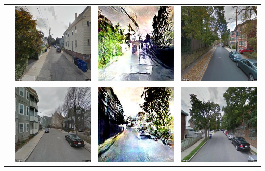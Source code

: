 \begin{table}
\begin{tabular}{l*3{C}@{}}
        & \includegraphics[width=11em]{u_4.jpeg} & \includegraphics[width=11em]{t_4.jpeg} &  \includegraphics[width=11em]{b_4.jpeg} \\ 
        & \includegraphics[width=11em]{u_5.jpeg} & \includegraphics[width=11em]{t_5.jpeg} &  \includegraphics[width=11em]{b_5.jpeg} \\ 

\end{tabular}
\end{table}
